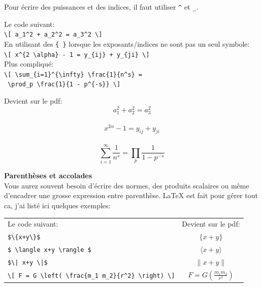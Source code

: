 \documentclass[11pt]{article}				%
\begin{document}
Pour écrire des puissances et des indices, il faut utiliser \verb|^| et \verb|_|.

\begin{multicols}{2}
Le code suivant:\\

\verb|\[ a_1^2 + a_2^2 = a_3^2 \]| \\

En utilisant des \texttt{\{ \}} lorsque les exposants/indices ne sont pas un seul symbole:\\

\verb|\[ x^{2 \alpha} - 1 = y_{ij} + y_{ji} \]|\\

Plus compliqué:\\

\verb|\[ \sum_{i=1}^{\infty} \frac{1}{n^s} =| \\
\verb| \prod_p \frac{1}{1 - p^{-s}} \] |

\columnbreak
\centering
Devient sur le pdf:\\

$$ a_1^2 + a_2^2 = a_3^2$$\\
$$ x^{2 \alpha} - 1 = y_{ij} + y_{ji} $$\\
\[ \sum_{i=1}^{\infty} \frac{1}{n^s} = \prod_p \frac{1}{1 - p^{-s}} \]

\end{multicols}

\textbf{Parenthèses et accolades}\\

Vous aurez souvent besoin d'écrire des normes, des produits scalaires ou même d'encadrer une grosse expression entre parenthèse. LaTeX est fait pour gérer tout ca, j'ai listé ici quelques exemples:\\

\begin{tabular}{lc}
\vspace{11pt} Le code suivant: & Devient sur le pdf:\\
	
\verb|$\{x+y\}$| & $ \{x+y\} $ \\

\verb|$ \langle x+y \rangle $| & $ \langle x+y \rangle $ \\

\verb?$\| x+y \|$? & $\| x+y \|$ \\

\verb|\[ F = G \left( \frac{m_1 m_2}{r^2} \right) \]| & $ F = G \left( \frac{m_1 m_2}{r^2} \right) $ \\

\end{tabular}\\
\end{document}
